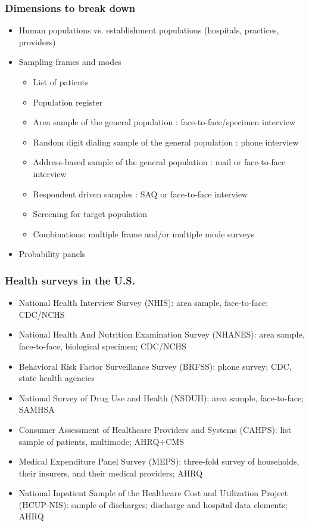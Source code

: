 \documentclass[handout]{beamer}
\begin{document}
\begin{frame}\frametitle{Dimensions to break down}

\begin{itemize}
    \item Human populations vs. establishment populations (hospitals, practices, providers)
    \item Sampling frames and modes
    \begin{itemize}
        \item List of patients
        \item Population register
        \item Area sample of the general population : face-to-face/specimen interview
        \item Random digit dialing sample of the general population : phone interview
        \item Address-based sample of the general population : mail or face-to-face interview
        \item Respondent driven samples : SAQ or face-to-face interview
        \item Screening for target population
        \item Combinations: multiple frame and/or multiple mode surveys
    \end{itemize}
    \item Probability panels
\end{itemize}

\end{frame}

\begin{frame}\frametitle{Health surveys in the U.S.}

\begin{itemize}
    \item National Health Interview Survey (NHIS): area sample, face-to-face; CDC/NCHS
    \item National Health And Nutrition Examination Survey (NHANES): area sample, face-to-face, biological specimen; CDC/NCHS
    \item Behavioral Risk Factor Surveillance Survey (BRFSS): phone survey; CDC, state health agencies
    \item National Survey of Drug Use and Health (NSDUH): area sample, face-to-face; SAMHSA
    \item Consumer Assessment of Healthcare Providers and Systems (CAHPS): list sample of patients, multimode; AHRQ+CMS
    \item Medical Expenditure Panel Survey (MEPS): three-fold survey of households, their insurers, and their medical providers; AHRQ
    \item National Inpatient Sample of the Healthcare Cost and Utilization Project (HCUP-NIS): 
    	sample of discharges; discharge and hospital data elements; AHRQ
\end{itemize}

\end{frame}
\end{document}
